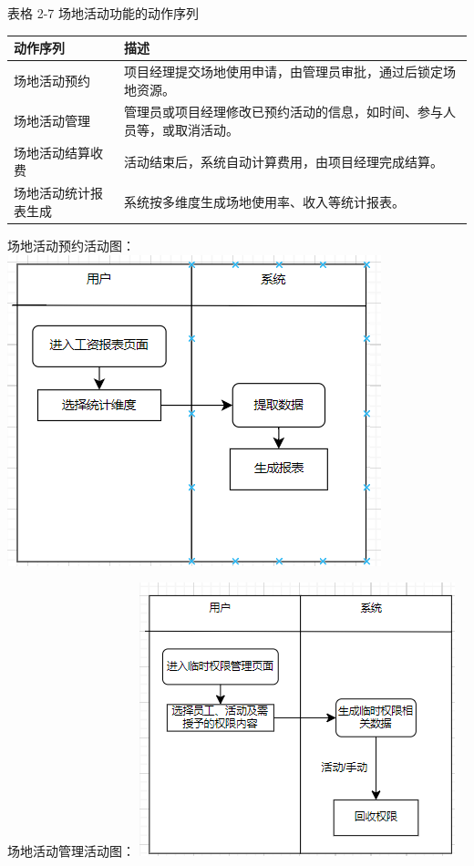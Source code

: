 \documentclass[]{article}
\begin{document}
表格 2-7 场地活动功能的动作序列
\begin{longtable}[]{@{}ll@{}}
\toprule
动作序列 & 描述\tabularnewline
\midrule
\endhead
场地活动预约 & 项目经理提交场地使用申请，由管理员审批，通过后锁定场地资源。\tabularnewline
场地活动管理 & 管理员或项目经理修改已预约活动的信息，如时间、参与人员等，或取消活动。\tabularnewline
场地活动结算收费 & 活动结束后，系统自动计算费用，由项目经理完成结算。\tabularnewline
场地活动统计报表生成 & 系统按多维度生成场地使用率、收入等统计报表。\tabularnewline
\bottomrule
\end{longtable}

场地活动预约活动图：
\includegraphics{media/media/image12.png}

场地活动管理活动图：
\includegraphics{media/media/image13.png}
\end{document}
